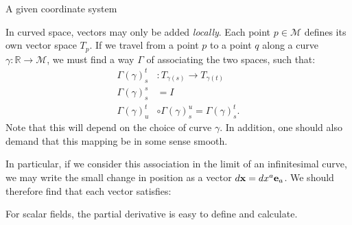 A given coordinate system

In curved space, vectors may only be added {\em locally}. Each point $p\in \mathcal{M}$ defines its own vector space $T_p$. If we travel from a point $p$ to a point $q$ along a curve $\gamma: \mathbb{R}\to \mathcal{M}$, we must find a way $\Gamma$ of associating the two spaces, such that:
\begin{align}
  \Gamma(\gamma)^t_s &: T_{\gamma(s)} \to T_{\gamma(t)} \\
  \Gamma(\gamma)^s_s &= I \\
  \Gamma(\gamma)^t_u &\circ \Gamma(\gamma)^u_s =  \Gamma(\gamma)^t_s.
\end{align}
Note that this will depend on the choice of curve $\gamma$.  In addition, one should also demand that this mapping be in some sense smooth.

In particular, if we consider this association in the limit of an infinitesimal curve, we may write the small change in position as a vector $d\mathbf{x} = dx^a \mathbf{e}_a$. We should therefore find that each vector satisfies:



For scalar fields, the partial derivative is easy to define and calculate.

